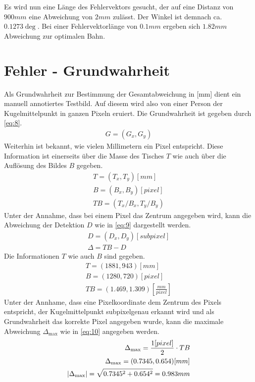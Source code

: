 Es wird nun eine Länge des Fehlervektors gesucht, der auf eine Distanz von $900mm$ eine Abweichung von $2mm$ zulässt.
Der Winkel ist demnach ca. $0.1273\deg$. Bei einer Fehlervektorlänge von $0.1mm$ ergeben sich $1.82mm$ Abweichung zur
optimalen Bahn.

\section{Fehler - Grundwahrheit}\label{anhang:fehler:grundwahrheit}
Als Grundwahrheit zur Bestimmung der Gesamtabweichung in [mm] dient ein manuell annotiertes Testbild.
Auf diesem wird also von einer Person der Kugelmittelpunkt in ganzen Pixeln eruiert. Die Grundwahrheit
ist gegeben durch \ref{eq:8}.
\begin{align}
    G = (G_x, G_y)\label{eq:8}
\end{align}
Weiterhin ist bekannt, wie vielen Millimetern ein Pixel entspricht. Diese Information ist einerseits über die Masse des
Tisches $T$ wie auch über die Auflösung des Bildes $B$ gegeben.
\begin{align}
    T = (T_x, T_y) [mm]\\
    B = (B_x, B_y) [pixel]\\
    TB = (T_x/B_x, T_y/B_y)
\end{align}
Unter der Annahme, dass bei einem Pixel das Zentrum angegeben wird, kann die Abweichung der Detektion $D$ wie in \ref{eq:9}
dargestellt werden.
\begin{align}
    D = (D_x, D_y) [subpixel]\\
    \Delta = TB - D\label{eq:9}
\end{align}
Die Informationen $T$ wie auch $B$ sind gegeben.
\begin{align}
    T = (1881, 943) [mm]\\
    B = (1280, 720) [pixel]\\
    TB = (1.469, 1.309) [\frac{mm}{pixel}]
\end{align}
Unter der Annhame, dass eine Pixelkoordinate dem Zentrum des Pixels entspricht, der Kugelmittelpunkt
subpixelgenau erkannt wird und als Grundwahrheit das korrekte Pixel angegeben wurde, kann die
maximale Abweichung $\Delta_{\max}$ wie in \ref{eq:10} angegeben werden.
\begin{align}
    \Delta_{\max} = \frac{1 [pixel]}{2} \cdot TB\label{eq:10}\\
    \Delta_{\max} = (0.7345, 0.654) [mm]\\
    \lvert \Delta_{\max} \rvert = \sqrt{0.7345^2 +  0.654^2} = 0.983 mm
\end{align}